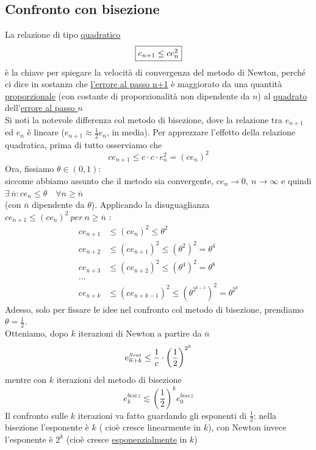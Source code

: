 \subsection{Confronto con bisezione}
La relazione di tipo \uline{quadratico}
\[\fbox{$e_{n+1}\leq ce_n^2$}\]
è la chiave per spiegare la velocità di convergenza del metodo di Newton, perché ci dice in sostanza che \uline{l'errore  al passo n+1} è maggiorato da una quantità \uline{proporzionale} (con costante di proporzionalità non dipendente da $n$) al \uline{quadrato} dell'\uline{errore al passo $n$} \\
Si noti la notevole differenza col metodo di bisezione, dove la relazione tra $e_{n+1}$ ed $e_n$ è lineare ($e_{n+1} \approx \frac{1}{2} e_n$, in media).
Per apprezzare l'effetto della relazione quadratica, prima di tutto osserviamo che
\[ ce_{n+1} \leq c \cdot c \cdot e_{n}^2 = ( ce_n)^2\]
Ora, fissiamo $\theta \in (0,1)$:\\
siccome abbiamo assunto che il metodo sia convergente, $ce_n\rightarrow0,\ n\rightarrow\infty$ e quindi $\exists \,\overline{n} : ce_n \leq \theta \quad \forall n \geq \overline{n}$\\
(con $\overline{n}$ dipendente da $\theta$). Applicando la disuguaglianza  $ce_{n+1} \leq (ce_n)^2 \ per \ n \geq \overline{n}$ : 
\[\begin{split}
    ce_{\overline{n}+1} & \le (ce_{\overline{n}})^2 \le \theta^2 \\
    ce_{\overline{n}+2} & \le (ce_{\overline{n}+1})^2\le \left(\theta^2\right)^2 = \theta^4 \\
    ce_{\overline{n}+3} & \le (ce_{\overline{n}+2})^2 \le \left(\theta^4\right)^2 = \theta^8 \\
    \dotso \\
    ce_{\overline{n}+k}& \le (ce_{\overline{n}+k-1})^2 \le \left(\theta^{2^{k-1}}\right)^2 = \theta^{2^k}
\end{split} \]
Adesso, solo per fissare le idee nel confronto col metodo di bisezione, prendiamo $\theta=\frac{1}{2}$. \\
Otteniamo, dopo $k$ iterazioni di Newton a partire da $\overline{n}$ \\
\[e^{\scalebox{.6}{$Newt$}}_{\overline{n}+k}\leq\frac{1}{c}\cdot\left(\frac{1}{2}\right)^{2^k}\]
mentre con $k$ iterazioni del metodo di bisezione 
\[ e^{bisez}_{k}\lesssim \left(\frac{1}{2}\right)^k e_{0}^{bisez}\]
Il confronto sulle $k$ iterazioni va fatto guardando gli esponenti
di $\frac{1}{2}$: nella bisezione l'esponente è $k$ ( cioè cresce linearmente in $k$), con Newton invece l'esponente è $2^k$ (cioè cresce \uline{esponenzialmente} in $k$)\\
